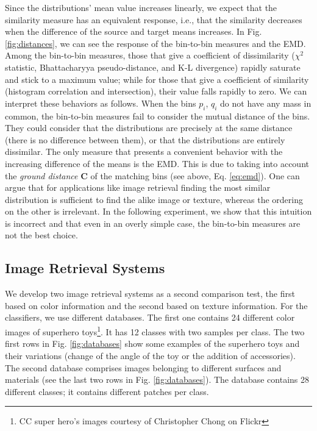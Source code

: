 Since the distributions' mean value increases linearly, we expect that the similarity measure has an equivalent response, i.e., that the similarity decreases when the difference of the source and target means increases. In Fig. \ref{fig:distances}, we can see the response of the bin-to-bin measures and the EMD. Among the bin-to-bin measures, those that give a coefficient of dissimilarity ($\chi^2$ statistic, Bhattacharyya pseudo-distance, and K-L divergence) rapidly saturate and stick to a maximum value; while for those that give a coefficient of similarity (histogram correlation and intersection), their value falls rapidly to zero. We can interpret these behaviors as follows. When the bins $p_i$, $q_i$ do not have any mass in common, the bin-to-bin measures fail to consider the mutual distance of the bins. They could consider that the distributions are precisely at the same distance (there is no difference between them), or that the distributions are entirely dissimilar. The only measure that presents a convenient behavior with the increasing difference of the means is the EMD. This is due to taking into account the \textit{ground distance} $\mathbf{C}$ of the matching bins (see above, Eq. \eqref{eq:emd}). One can argue that for applications like image retrieval finding the most similar distribution is sufficient to find the alike image or texture, whereas the ordering on the other is irrelevant. In the following experiment, we show that this intuition is incorrect and that even in an overly simple case, the bin-to-bin measures are not the best choice.
 
\subsection{Image Retrieval Systems}
We develop two image retrieval systems as a second comparison test, the first based on color information and the second based on texture information. For the classifiers, we use different databases. The first one contains 24 different color images of superhero toys\footnote{CC super hero's images courtesy of Christopher Chong on Flickr}. It has 12 classes with two samples per class. The two first rows in Fig. \ref{fig:databases} show some examples of the superhero toys and their variations (change of the angle of the toy or the addition of accessories). The second database \citep{Kylberg:Dataset:2011} comprises images belonging to different surfaces and materials (see the last two rows in Fig. \ref{fig:databases}). The database contains 28 different classes; it contains different patches per class. 

